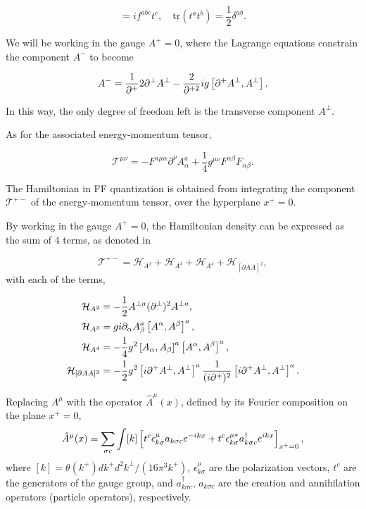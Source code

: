 \documentclass[11pt,a4paper,twoside,pdf]{article}
\numberwithin{equation}{section}
\begin{document}
\begin{equation}
    [t^a, t^b] = i f^{abc} t^c, \quad \text{tr}(t^a t^b) = \frac{1}{2} \delta^{ab}.
\end{equation}

We will be working in the gauge $A^+=0$, where the Lagrange equations constrain
the component $A^-$ to become 

\begin{equation}
    A^- = \frac{1}{\partial^+}2 \partial^\perp A^\perp - \frac{2}{\partial^{+2}} ig 
    \left[ \partial^+ A^\perp, A^\perp \right].
\end{equation}

In this way, the only degree of freedom left is the transverse component $A^\perp$.

As for the associated energy-momentum tensor,

\begin{equation}
    \mathcal{T}^{\mu\nu} = -F^{a\mu\alpha}\partial^\nu A^a_\alpha + 
    \frac{1}{4}g^{\mu\nu}F^{\alpha\beta} F_{\alpha\beta}.
\end{equation}

The Hamiltonian in FF quantization is obtained from integrating the component
$\mathcal{T}^{+-}$ of the energy-momentum tensor, over the hyperplane $x^+=0$. 

By working in the gauge $A^+=0$, the Hamiltonian density can be expressed as the sum of 
4 terms, as denoted in \cite{glazek_dynamics_2001}

\begin{equation}
    \mathcal{T}^{+-} = \mathcal{H}_{A^2} + \mathcal{H}_{A^3} +
    \mathcal{H}_{A^4} + \mathcal{H}_{[\partial AA]^2},
\end{equation}
with each of the terms, 

\begin{align}
    \mathcal{H}_{A^2} &= -\frac{1}{2} A^{\perp a} (\partial^\perp)^2 A^{\perp a}, \\
    \mathcal{H}_{A^3} &= g i \partial_\alpha A^a_\beta \left[ A^\alpha, A^\beta \right]^a, \\
    \mathcal{H}_{A^4} &= -\frac{1}{4} g^2 \left[ A_\alpha, A_\beta \right]^a
    \left[ A^\alpha, A^\beta \right]^a, \\
    \mathcal{H}_{[\partial AA]^2} &= -\frac{1}{2} g^2 \left[ i \partial^+ A^\perp,
    A^\perp \right]^a  \frac{1}{(i\partial^+)^2} \left[ i\partial^+ A^\perp, A^\perp \right]^a.
\end{align}

Replacing $A^\mu$ with the operator $\hat{A}^\mu(x)$, defined by its Fourier composition
on the plane $x^+=0$,
\begin{equation}
    \hat{A}^\mu(x) = \sum _{\sigma c} \int [k] \left[ t^c \epsilon^\mu_{k \sigma} 
    a_{k\sigma c}  e^{-ikx} + t^c \epsilon^{\mu*}_{k \sigma} 
    a^\dagger_{k\sigma c}  e^{ikx} \right]_{x^+=0},
\end{equation}
where $[k] = \theta(k^+) dk^+ d^2k^\perp / (16\pi^3k^+)$, $\epsilon^\mu_{k \sigma}$ 
are the polarization vectors, $t^c$ are the generators of the gauge group, and $a^\dagger_{k\sigma c}$, $a_{k\sigma c}$ are the 
creation and annihilation operators (particle operators), respectively. 
\end{document}
